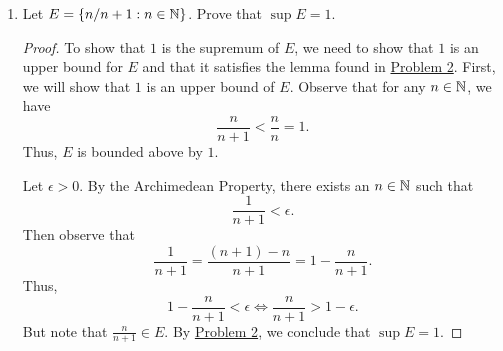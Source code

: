 \documentclass[11pt,a4paper]{article}
\begin{document}
\begin{enumerate}
\begin{proof}
    Suppose \( \gamma < \alpha  \). Thus, we have \( \alpha - \gamma > 0  \). Choose  \( \epsilon = \alpha - \gamma  \).  Our goal is to find some element \( x \in E  \) such that \( x > \alpha - \epsilon \). Choose \( \epsilon = \alpha - \gamma  \). By assumption, there exists an element \( {x}_{0} \in E  \) such that     
    \[  {x}_{0} > \alpha - \epsilon = \alpha - (\alpha - \gamma) = \gamma. \]
    Thus, \( {x}_{0} > \gamma  \) for some \( {x}_{0} \in E  \). Therefore, \( \gamma  \) is NOT an upper bound of \( E  \) and so we conclude that 
    \[  \alpha = \sup E. \]
    \end{proof}

\item Let \( E  = \{ n / n + 1 : n \in \mathbb{N}  \}  \). Prove that \( \sup E  = 1  \). 
    \begin{proof}
    To show that \( 1  \) is the supremum of \( E  \), we need to show that \( 1  \) is an upper bound for \( E  \) and that it satisfies the lemma found in {\hyperref[Problem 2]{Problem 2}}. First, we will show that \( 1  \) is an upper bound of \( E  \). Observe that for any \( n \in \mathbb{N}  \), we have  
    \[  \frac{ n  }{  n + 1  }  < \frac{  n }{ n }  = 1.  \]
    Thus, \( E  \) is bounded above by \( 1 \). 

    Let \( \epsilon > 0  \). By the Archimedean Property, there exists an \( n \in \mathbb{N}  \) such that   
    \[ \frac{ 1 }{ n + 1  } < \epsilon.  \]
    Then observe that 
    \[  \frac{ 1 }{ n + 1  }  = \frac{ (n+1) - n  }{ n + 1  } = 1 - \frac{ n  }{ n + 1  }.   \]
    Thus, 
    \[  1 - \frac{ n }{ n + 1  } < \epsilon \Longleftrightarrow \frac{ n }{ n + 1 }  > 1 - \epsilon. \]
    But note that \( \frac{  n  }{  n+ 1 } \in E   \). By {\hyperref[Problem 2]{Problem 2}}, we conclude that \( \sup E = 1    \). 
    
    

     \end{proof}


\end{enumerate}
\end{document}
